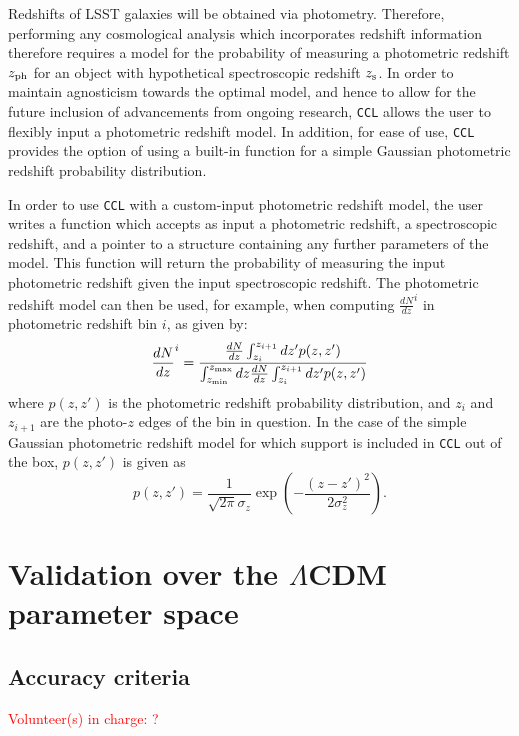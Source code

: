 \documentclass[\docopts]{\docclass}
\newcommand{\vol}[1]{\textcolor{red}{Volunteer(s) in charge: #1}}
\newcommand{\ccl}{{\tt CCL}\xspace}
\begin{document}
Redshifts of LSST galaxies will be obtained via photometry. Therefore, performing any cosmological analysis which incorporates redshift information therefore requires a model for the probability of measuring a photometric redshift $z_{\rm ph}$ for an object with hypothetical spectroscopic redshift $z_{\rm s}$.  In order to maintain agnosticism towards the optimal model, and hence to allow for the future inclusion of advancements from ongoing research, \ccl allows the user to flexibly input a photometric redshift model. In addition, for ease of use, \ccl provides the option of using a built-in function for a simple Gaussian photometric redshift probability distribution.

In order to use \ccl with a custom-input photometric redshift model, the user writes a function which accepts as input a photometric redshift, a spectroscopic redshift, and a pointer to a structure containing any further parameters of the model. This function will return the probability of measuring the input photometric redshift given the input spectroscopic redshift. The photometric redshift model can then be used, for example, when computing $\frac{dN}{dz}^i$ in photometric redshift bin $i$, as given by:
\begin{equation}
\frac{dN}{dz}^i = \frac{\frac{dN}{dz}\int_{z_i}^{z_{i+1}} dz' p(z,z')}{\int_{z_{\rm min}}^{z_{\rm max}}dz \frac{dN}{dz} \int_{z_i}^{z_{i+1}}dz' p(z, z')}
\label{photoz}
\end{equation}
where $p(z,z')$ is the photometric redshift probability distribution, and $z_{i}$ and $z_{i+1}$ are the photo-$z$ edges of the bin in question. In the case of the simple Gaussian photometric redshift model for which support is included in \ccl out of the box, $p(z, z')$ is given as
\begin{equation}
p(z,z') = \frac{1}{\sqrt{2 \pi}\sigma_z} \exp\left(-\frac{(z-z')^2}{2\sigma_z^2}\right).
\label{pz_gauss}
\end{equation}



\section{Validation over the $\Lambda$CDM parameter space}

\subsection{Accuracy criteria}
\vol{?}
\end{document}
